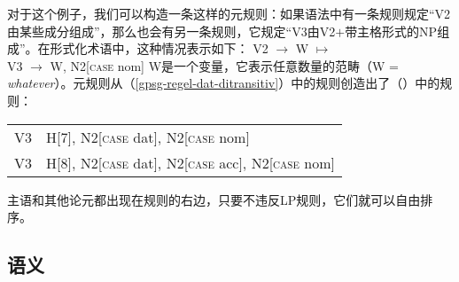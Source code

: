 对于这个例子，我们可以构造一条这样的元规则：如果语法中有一条规则规定“V2由某些成分组成”，那么也会有另一条规则，它规定“V3由V2$+$带主格形式的NP组成”。在形式化术语中，这种情况表示如下：
\ea
\label{subjekt-meta}
V2  $\to$ W $\mapsto$\\
V3  $\to$ W, N2[\textsc{case} nom]
\z
W是一个变量，它表示任意数量的范畴（W = \emph{what\-ever}）。元规则从（\ref{gpsg-regel-dat-ditransitiv}）中的规则创造出了（）中的规则：
\ea
\begin{tabular}[t]{@{}l@{~$\to$~}l@{}}
V3  & H[7], N2[\textsc{case} dat], N2[\textsc{case} nom]                \\
V3  & H[8], N2[\textsc{case} dat], N2[\textsc{case} acc], N2[\textsc{case} nom]  \\
\end{tabular}
\z

\noindent
主语和其他论元都出现在规则的右边，只要不违反LP规则，它们就可以自由排序。

\subsection{语义}
\label{Sec-GPSG-Sem}

